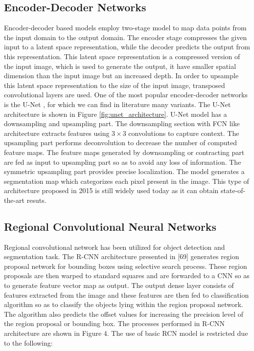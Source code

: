 \subsection{Encoder-Decoder Networks}
Encoder-decoder based models employ two-stage model to map data points from the
input domain to the output domain. The encoder stage compresses the given input
to a latent space representation, while the decoder predicts the output from
this representation. This latent space representation is a compressed version of
the input image, which is used to generate the output, it have smaller spatial dimension
than the input image but an increased depth. In order to upsample this latent space representation
to the size of the input image, transposed convolutional layers are used.
One of the most popular encoder-decoder networks is the U-Net
\cite{ronneberger2015u}, for which we can find in literature many variants. The
U-Net architecture is shown in Figure \ref{fig:unet_architecture}.
U-Net model has a downsampling and upsampling part. The downsampling
section with FCN like architecture extracts features using $3 \times 3$ convolutions to
capture context. The upsampling part performs deconvolution to decrease the
number of computed feature maps. The feature maps generated by downsampling or
contracting part are fed as input to upsampling part so as to avoid any loss of
information. The symmetric upsampling part provides precise localization. The
model generates a segmentation map which categorizes each pixel present in the
image. This type of architecture proposed in 2015 is still widely used today as
it can obtain state-of-the-art resuts.

\subsection{Regional Convolutional Neural Networks}
Regional convolutional network has been utilized for object detection and
segmentation task. The R-CNN architecture presented in [69] generates region
proposal network for bounding boxes using selective search process. These region
proposals are then warped to standard squares and are forwarded to a CNN so as
to generate feature vector map as output. The output dense layer consists of
features extracted from the image and these features are then fed to
classification algorithm so as to classify the objects lying within the region
proposal network. The algorithm also predicts the offset values for increasing
the precision level of the region proposal or bounding box. The processes
performed in R-CNN architecture are shown in Figure 4. The use of basic RCN
model is restricted due to the following:

